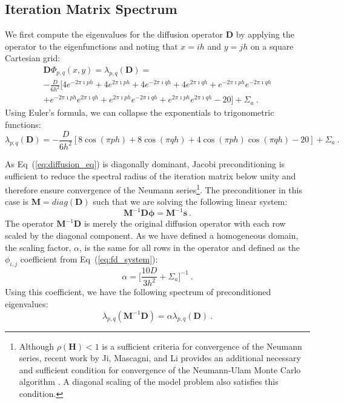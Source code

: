 \documentclass[preprint,11pt]{elsarticle}
\newcommand{\ve}[1]{\ensuremath{\mathbf{#1}}}
\begin{document}
\subsection{Iteration Matrix Spectrum}
\label{subsec:iteration_spectrum}

We first compute the eigenvalues for the diffusion operator $\ve{D}$ by
applying the operator to the eigenfunctions and noting that $x=ih$ and $y=jh$
on a square Cartesian grid:
\begin{multline}
  \ve{D}\Phi_{p,q}(x,y) = \lambda_{p,q}(\ve{D})
  =\\ -\frac{D}{6h^2}\Big[4 e^{-2 \pi \imath p h} + 4 e^{2 \pi \imath
      p h} + 4 e^{-2 \pi \imath q h} + 4 e^{2 \pi \imath q h} + e^{-2
      \pi \imath p h} e^{-2 \pi \imath q h} \\ + e^{-2 \pi \imath p h}
    e^{2 \pi \imath q h} + e^{2 \pi \imath p h} e^{-2 \pi \imath q h}
    + e^{2 \pi \imath p h} e^{2 \pi \imath q h} - 20\Big] + \Sigma_a
  \:.
  \label{eq:deriv_diff_1}
\end{multline}
Using Euler's formula, we can collapse the exponentials to
trigonometric functions:
\begin{equation}
  \lambda_{p,q}(\ve{D}) = -\frac{D}{6h^2}[ 8 \cos(\pi p h) + 8
    \cos(\pi q h) + 4 \cos(\pi p h) \cos(\pi q h) - 20] + \Sigma_a\:.
  \label{eq:deriv_diff_2}
\end{equation}

As Eq~(\ref{eq:diffusion_eq}) is diagonally dominant, Jacobi preconditioning
is sufficient to reduce the spectral radius of the iteration matrix below
unity and therefore ensure convergence of the Neumann series\footnote{Although
  $\rho(\ve{H}) < 1$ is a sufficient criteria for convergence of the Neumann
  series, recent work by Ji, Mascagni, and Li provides an additional necessary
  and sufficient condition for convergence of the Neumann-Ulam Monte Carlo
  algorithm \cite{ji_2013}. A diagonal scaling of the model problem also
  satisfies this condition.}. The preconditioner in this case is $\ve{M}
= diag(\ve{D})$ such that we are solving the following linear system:
\begin{equation}
  \ve{M}^{-1} \ve{D} \boldsymbol{\phi} = \ve{M}^{-1} \ve{s}\:.
  \label{eq:precond_diffsion}
\end{equation}
The operator $\ve{M}^{-1} \ve{D}$ is merely the original diffusion operator
with each row scaled by the diagonal component. As we have defined a
homogeneous domain, the scaling factor, $\alpha$, is the same for all rows in
the operator and defined as the $\phi_{i,j}$ coefficient from
Eq~(\ref{eq:fd_system}):
\begin{equation}
  \alpha = \Bigg[\frac{10 D}{3 h^2} + \Sigma_a\Bigg]^{-1}\:.
  \label{eq:jacobi_scaling}
\end{equation}
Using this coefficient, we have the following spectrum of preconditioned
eigenvalues:
\begin{equation}
  \lambda_{p,q}(\ve{M}^{-1} \ve{D}) = \alpha \lambda_{p,q}(\ve{D})\:.
  \label{eq:preconditioned_eigenvalues}
\end{equation}
\end{document}
